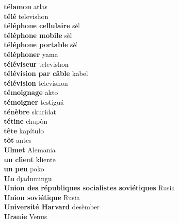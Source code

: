 \textbf{ télamon  } atlas \\
\textbf{ télé  } televishon \\
\textbf{ téléphone cellulaire  } sèl \\
\textbf{ téléphone mobile  } sèl \\
\textbf{ téléphone portable  } sèl \\
\textbf{ téléphoner  } yama \\
\textbf{ téléviseur  } televishon \\
\textbf{ télévision par câble  } kabel \\
\textbf{ télévision  } televishon \\
\textbf{ témoignage  } akto \\
\textbf{ témoigner  } testiguá \\
\textbf{ ténèbre  } skuridat \\
\textbf{ tétine  } chupòn \\
\textbf{ tête  } kapítulo \\
\textbf{ tôt  } antes \\
\textbf{ Ulmet  } Alemania \\
\textbf{ un client  } kliente \\
\textbf{ un peu  } poko \\
\textbf{ Un  } djadumingu \\
\textbf{ Union des républiques socialistes soviétiques  } Rusia \\
\textbf{ Union soviétique  } Rusia \\
\textbf{ Université Harvard  } desèmber \\
\textbf{ Uranie  } Venus \\
